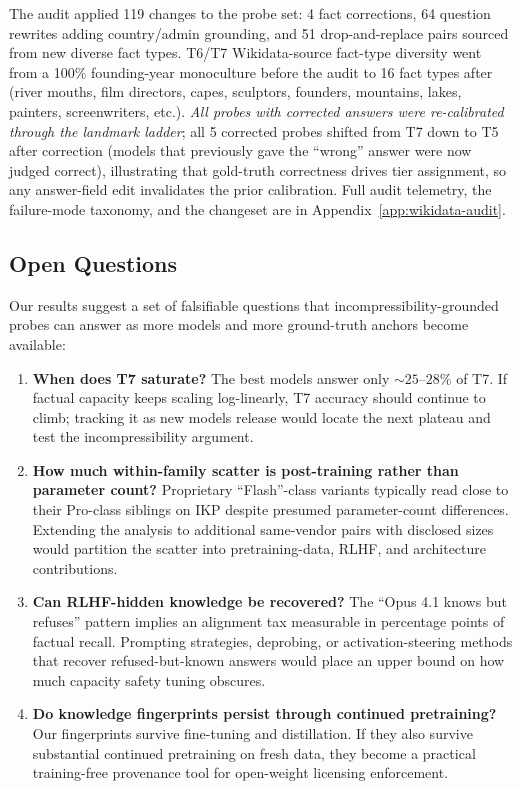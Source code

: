 \documentclass[11pt]{article}
\begin{document}
The audit applied 119 changes to the probe set: 4 fact corrections, 64 question rewrites adding country/admin grounding, and 51 drop-and-replace pairs sourced from new diverse fact types. T6/T7 Wikidata-source fact-type diversity went from a 100\% founding-year monoculture before the audit to 16 fact types after (river mouths, film directors, capes, sculptors, founders, mountains, lakes, painters, screenwriters, etc.). \emph{All probes with corrected answers were re-calibrated through the landmark ladder}; all 5 corrected probes shifted from T7 down to T5 after correction (models that previously gave the ``wrong'' answer were now judged correct), illustrating that gold-truth correctness drives tier assignment, so any answer-field edit invalidates the prior calibration. Full audit telemetry, the failure-mode taxonomy, and the changeset are in Appendix~\ref{app:wikidata-audit}.

\subsection{Open Questions}
\label{sec:open-questions}

Our results suggest a set of falsifiable questions that incompressibility-grounded probes can answer as more models and more ground-truth anchors become available:

\begin{enumerate}[leftmargin=*]
    \item \textbf{When does T7 saturate?} The best models answer only ${\sim}25$--$28\%$ of T7. If factual capacity keeps scaling log-linearly, T7 accuracy should continue to climb; tracking it as new models release would locate the next plateau and test the incompressibility argument.
    \item \textbf{How much within-family scatter is post-training rather than parameter count?} Proprietary ``Flash''-class variants typically read close to their Pro-class siblings on IKP despite presumed parameter-count differences. Extending the analysis to additional same-vendor pairs with disclosed sizes would partition the scatter into pretraining-data, RLHF, and architecture contributions.
    \item \textbf{Can RLHF-hidden knowledge be recovered?} The ``Opus 4.1 knows but refuses'' pattern implies an alignment tax measurable in percentage points of factual recall. Prompting strategies, deprobing, or activation-steering methods that recover refused-but-known answers would place an upper bound on how much capacity safety tuning obscures.
    \item \textbf{Do knowledge fingerprints persist through continued pretraining?} Our fingerprints survive fine-tuning and distillation. If they also survive substantial continued pretraining on fresh data, they become a practical training-free provenance tool for open-weight licensing enforcement.
\end{enumerate}
\end{document}
